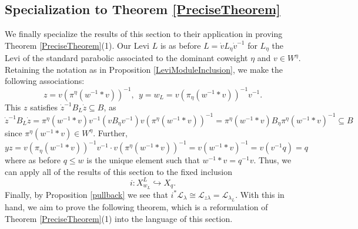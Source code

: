 \documentclass[12pt,reqno]{amsart}
\theoremstyle{definition}
\begin{document}


 
 \subsection{Specialization to Theorem \ref{PreciseTheorem}} 
 We finally specialize the results of this section to their application in proving Theorem \ref{PreciseTheorem}(1). Our Levi $L$ is as before $L=\dot{v}L_\eta \dot{v}^{-1}$ for $L_\eta$ the Levi of the standard parabolic associated to the dominant coweight $\eta$ and $v \in W^\eta$. Retaining the notation as in Proposition \ref{LeviModuleInclusion}, we make the following associations: 
 $$
 z=v(\pi^\eta(w^{-1} \ast v))^{-1}, \ \ y =w_L = v(\pi_\eta(w^{-1} \ast v))^{-1} v^{-1}.
 $$
 This $z$ satisfies $\dot{z}^{-1}B_L \dot{z} \subseteq B$, as 
 $$
 \dot{z}^{-1} B_L \dot{z} = \pi^{\eta}(w^{-1} \ast v) v^{-1} \left( v B_\eta v^{-1} \right) v (\pi^\eta(w^{-1} \ast v))^{-1} = \pi^{\eta}(w^{-1} \ast v) B_\eta \pi^{\eta}(w^{-1} \ast v)^{-1} \subseteq B
 $$
 since $\pi^{\eta}(w^{-1} \ast v) \in W^\eta$. Further, 
 $$
 yz= v(\pi_\eta(w^{-1} \ast v))^{-1} v^{-1} \cdot v(\pi^\eta(w^{-1} \ast v))^{-1} = v(w^{-1} \ast v)^{-1} = v(v^{-1} q) = q
 $$
 where as before $q \leq w$ is the unique element such that $w^{-1} \ast v = q^{-1} v$. Thus, we can apply all of the results of this section to the fixed inclusion 
 $$
 i: X^L_{w_L} \hookrightarrow X_q.
 $$
 Finally, by Proposition \ref{pullback} we see that $i^\ast \mathscr{L}_\lambda \cong \mathscr{L}_{z\lambda} =\mathscr{L}_{\lambda_L}$. With this in hand, we aim to prove the following theorem, which is a reformulation of Theorem \ref{PreciseTheorem}(1) into the language of this section. 
 
\end{document}

